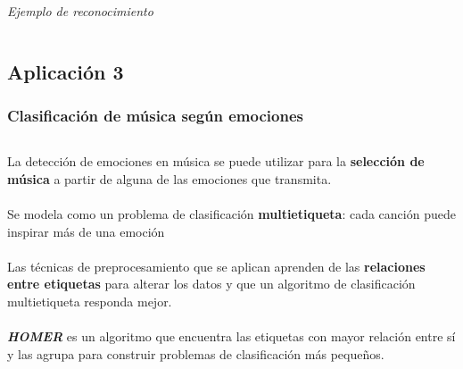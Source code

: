 \documentclass[8pt]{beamer}
\begin{document}
\begin{frame}
\begin{columns}[T]
\begin{column}{.5\textwidth}
\begin{center}
	  \\ \centering \textit{Ejemplo de reconocimiento}
	  \end{center}
       \end{column}
      \end{columns}
    \end{frame}


\subsection{Aplicación 3}
  \begin{frame}
	\frametitle{Clasificación de música según emociones}
	\begin{columns}[T]
		\begin{column}{.5\textwidth}
			La detección de emociones en música se puede utilizar para la 
			\textbf{selección de música} a partir de alguna de las emociones que transmita.
			\\~\\
			Se modela como un problema de clasificación \textbf{multietiqueta}:
			cada canción puede inspirar más de una emoción
			\\~\\
			Las técnicas de preprocesamiento que se aplican aprenden de las
			\textbf{relaciones entre etiquetas} para alterar los datos y que
			un algoritmo de clasificación multietiqueta responda mejor.
			\\~\\
			\textbf{\textit{HOMER}} es un algoritmo que encuentra las etiquetas con mayor
			relación entre sí y las agrupa para construir problemas de clasificación
			más pequeños.
			

\end{column}
\end{columns}
\end{frame}
\end{document}
